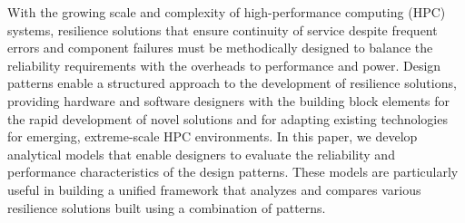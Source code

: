 With the growing scale and complexity of high-performance computing (HPC) systems, resilience solutions that ensure continuity of service despite frequent errors and component failures must be methodically designed to balance the reliability requirements with the overheads to performance and power.   
Design patterns enable a structured approach to the development of resilience solutions, providing hardware and software designers with the building block elements for the rapid development of novel solutions and for adapting existing technologies for emerging, extreme-scale HPC environments.   
In this paper, we develop analytical models that enable designers to evaluate the reliability and performance characteristics of the design patterns. These models are particularly useful in building a unified framework that analyzes and compares various resilience solutions built using a combination of patterns.
